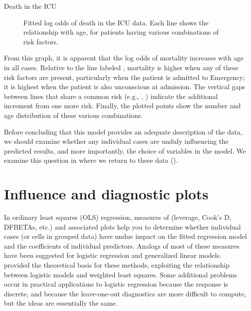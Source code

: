 \documentclass[11pt]{book}
\renewenvironment{knitrout}{\small\renewcommand{\baselinestretch}{.85}}{} %
\begin{document}
\begin{Example}[icu1]{Death in the ICU}
\begin{knitrout}
\begin{figure}[!htbp]
\caption[Fitted log odds of death in the ICU data]{Fitted log odds of death in the ICU data. Each line shows the relationship with age, for patients having various combinations of risk factors.\label{fig:icu1-fit-plot}}
\end{figure}


\end{knitrout}
From this graph, it is apparent that the log odds of mortality increases with
age in all cases. Relative to the line labeled ,
mortality is higher when any of these risk factors are present, particularly
when the patient is admitted to Emergency; it is highest when the
patient is also unconscious at admission.  The vertical gaps between lines
that share a common risk (e.g., , )
indicate the additional increment from one more risk.
Finally, the plotted points show the number and age distribution of
these various combinations.

Before concluding that this model provides an adequate description of the
data, we should examine whether any individual cases are unduly influencing
the predicted results, and more importantly, the choice of variables in
the model.  We examine this question in 
where we return to these data ().



\end{Example}


\section{Influence and diagnostic plots}\label{sec:logist-infl}

In ordinary least squares (OLS) regression, measures of 
(leverage, Cook's D, DFBETAs, etc.) and associated plots
help you to determine whether
individual cases (or cells in grouped data)
have undue impact on the fitted regression model and
the coefficients of individual predictors.
Analogs of most of these
measures have been suggested for logistic regression
and generalized linear models.
\citet{Pregibon:81} provided the theoretical basis for these methods,
exploiting the relationship between logistic models and
weighted least squares.  Some
additional problems occur in practical applications to
logistic regression because the response
is discrete, and because the leave-one-out diagnostics are more
difficult to compute, but the ideas are essentially the same.
\end{document}
